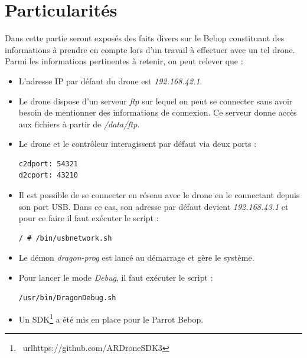 \documentclass[12pt, openany]{report}
\begin{document}
\section{Particularités}
Dans cette partie seront exposés des faits divers sur le Bebop constituant des informations à prendre en compte lors d'un travail à effectuer avec un tel drone. Parmi les informations pertinentes à retenir, on peut relever que : 
\begin{itemize}
\item L'adresse IP par défaut du drone est \textit{192.168.42.1}.
\item Le drone dispose d'un serveur \textit{ftp} sur lequel on peut se connecter sans avoir besoin de mentionner des informations de connexion. Ce serveur donne accès aux fichiers à partir de \textit{/data/ftp}.
\item Le drone et le contrôleur interagissent par défaut via deux ports : 
\begin{lstlisting}[frame=single]
c2dport: 54321
d2cport: 43210
\end{lstlisting}
\item Il est possible de se connecter en réseau avec le drone en le connectant depuis son port USB. Dans ce cas, son adresse par défaut devient \textit{192.168.43.1} et pour ce faire il faut exécuter le script :
\begin{lstlisting}[frame=single]
/ # /bin/usbnetwork.sh
\end{lstlisting}
\item Le démon \textit{dragon-prog} est lancé au démarrage et gère le système.
\item Pour lancer le mode \textit{Debug}, il faut exécuter le script :
\begin{lstlisting}[frame=single]
/usr/bin/DragonDebug.sh
\end{lstlisting}
\item Un SDK\footnote{\ url{https://github.com/ARDroneSDK3}} a été mis en place pour le Parrot Bebop.
\end{itemize}
\end{document}
